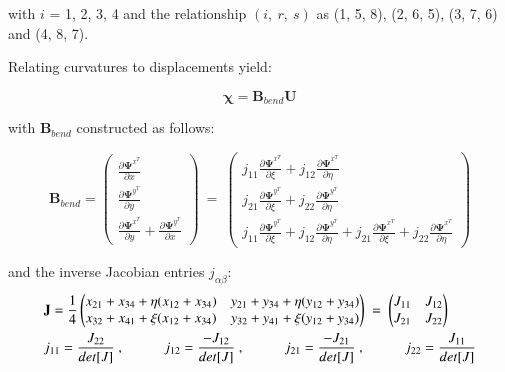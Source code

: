with $i$ = 1, 2, 3, 4 and the relationship $(i,\ r,\ s)$ as (1, 5, 8), (2, 6, 5), (3, 7, 6) and (4, 8, 7).

Relating curvatures to displacements yield:

\begin{equation} 
\boldsymbol{\chi} = \mathbf{B}_{bend} \mathbf{U}
\label{equation27}
\end{equation}

with $\mathbf{B}_{bend}$ constructed as follows:

\begin{equation} 
\mathbf{B}_{bend} =
\begin{pmatrix}
\frac{\partial \mathbf{\Psi}^{x^T}}{\partial x} \\
\frac{\partial \mathbf{\Psi}^{y^T}}{\partial y} \\
\frac{\partial \mathbf{\Psi}^{x^T}}{\partial y} + \frac{\partial \mathbf{\Psi}^{y^T}}{\partial x}
\end{pmatrix}
\ =\ 
\begin{pmatrix}
j_{11} \frac{\partial \mathbf{\Psi}^{x^T}}{\partial \xi}  + j_{12} \frac{\partial \mathbf{\Psi}^{x^T}}{\partial \eta}  \\
j_{21} \frac{\partial \mathbf{\Psi}^{y^T}}{\partial \xi} + j_{22} \frac{\partial \mathbf{\Psi}^{y^T}}{\partial \eta} \\
j_{11} \frac{\partial \mathbf{\Psi}^{y^T}}{\partial \xi}  + j_{12} \frac{\partial \mathbf{\Psi}^{y^T}}{\partial \eta} + j_{21} \frac{\partial \mathbf{\Psi}^{x^T}}{\partial \xi} + j_{22} \frac{\partial \mathbf{\Psi}^{x^T}}{\partial \eta}
\end{pmatrix}
\label{equation28}
\end{equation}

and the inverse Jacobian entries $j_{\alpha \beta}$:
\begin{gather} 
	\begin{aligned}
		&\mathbf{J} = \frac{1}{4}
		\begin{pmatrix}
			x_{21} + x_{34} + \eta (x_{12} + x_{34}) & y_{21} + y_{34} + \eta (y_{12} + y_{34}) \\
			x_{32} + x_{41} + \xi (x_{12} + x_{34}) & y_{32} + y_{41} + \xi (y_{12} + y_{34})
		\end{pmatrix}
		\ = \ 
		\begin{pmatrix}
			J_{11} & J_{12} \\
			J_{21} & J_{22}
		\end{pmatrix} \\
		&j_{11} = \frac{J_{22}}{det[J]}\ ,
		\hspace{10mm}
		j_{12} = \frac{-J_{12}}{det[J]}\ ,
		\hspace{10mm}
		j_{21} = \frac{-J_{21}}{det[J]}\ ,
		\hspace{10mm}
		j_{22} = \frac{J_{11}}{det[J]}
		\label{equation29}
	\end{aligned}
\end{gather}


